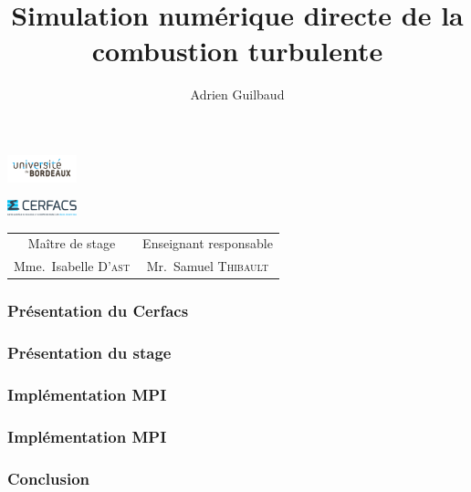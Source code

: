 \documentclass{beamer}
\author{Adrien Guilbaud}
\title{Simulation numérique directe de la combustion turbulente}
\begin{document}
 

\begin{frame}
    \parbox[c]{-50cm}{\centering%
      \includegraphics[width=2cm]{figures/logo_fac.jpg}%
    }%
    \parbox[c]{19.5cm}{\centering%
      \includegraphics[width=2cm]{figures/logo_cerfacs.eps}
    }%
\maketitle

\centering
\footnotesize
\begin{tabular}{cc}
  Maître de stage & Enseignant responsable \\
  Mme.~Isabelle \textsc{D'ast} &   Mr.~Samuel \textsc{Thibault} \\
  \end{tabular}
\end{frame}


\begin{frame}
  \frametitle{Présentation du Cerfacs}
  
\end{frame}

\begin{frame}
  \frametitle{Présentation du stage}
  
\end{frame}

\begin{frame}
  \frametitle{Implémentation MPI}
  
\end{frame}

\begin{frame}
  \frametitle{Implémentation MPI}
  
\end{frame}


\begin{frame}
  \frametitle{Conclusion}
  
\end{frame}
\end{document}
